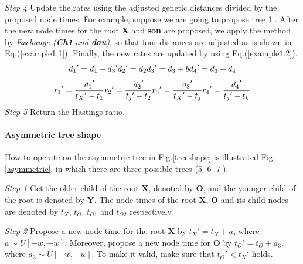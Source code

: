 \documentclass{bmcart}
\begin{document}
\emph{Step 4}  Update the rates using the adjusted genetic distances divided by the proposed node times. For example, suppose we are going to propose tree \textcircled1. After the new node times for the root \textbf{X} and \textbf{son} are proposed, we apply the method by \textit{Exchange (\textbf{Ch1} and \textbf{dau})}, so that four distances are adjusted as is shown in Eq.(\ref{example1.1}). Finally, the new rates are updated by using Eq.(\ref{example1.2}).
\begin{equation}\label{example1.1}
{d_1}' = {d_1} - {d_3}'  \\
{d_2}' = {d_2} \\
{d_3}' = {d_3} + b \\
{d_4}' = {d_3} + {d_4}
\end{equation}
\begin{equation}\label{example1.2}
{r_1}' = \frac{{{d_1}'}}{{{t_X}' - {t_1}}} \\
{r_2}' = \frac{{{d_2}'}}{{{t_j}' - {t_2}}} \\
{r_3}' = \frac{{{d_3}'}}{{{t_X}' - {t_j}}} \\
{r_4}' = \frac{{{d_4}'}}{{{t_j}' - {t_k}}} 
\end{equation}
\emph{Step 5} Return the Hastings ratio.
\paragraph*{Asymmetric tree shape}

How to operate on the asymmetric tree in Fig.\ref{treeshape} is illustrated Fig.\ref{asymmetric}, in which there are three possible trees (\textcircled5 \textcircled6 \textcircled7).

\emph{Step 1} Get the older child of the root \textbf{X}, denoted by \textbf{O}, and the younger child of the root is denoted by \textbf{Y}. The node times of the root \textbf{X},  \textbf{O} and its child nodes are denoted by ${t_X}$, ${t_O}$, ${t_{O1}}$ and ${t_{O2}}$ respectively. 

\emph{Step 2} Propose a new node time for the root \textbf{X} by ${t_X}' = {t_X} + a$, where $a \sim U[ - w, + w]$. Moreover, propose a new node time for \textbf{O} by ${t_O}' = {t_O} + {a_3}$, where ${a_3} \sim U[ - w, + w]$. To make it valid, make sure that ${t_O}' < {t_X}'$ holds.  
\end{document}
